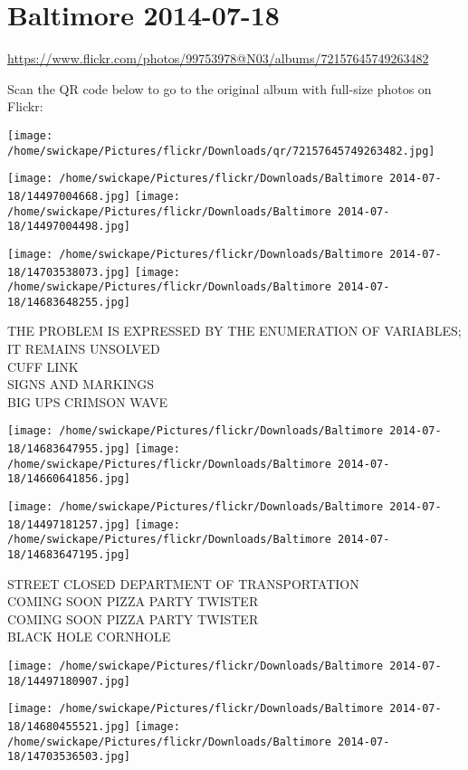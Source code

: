 \documentclass[10pt,letterpaper]{article}
\title{}
\author{}
\date{}
\begin{document}
\section*{Baltimore 2014-07-18}

\url{https://www.flickr.com/photos/99753978@N03/albums/72157645749263482}

Scan the QR code below to go to the original album with full-size photos on Flickr:

\texttt{[image: /home/swickape/Pictures/flickr/Downloads/qr/72157645749263482.jpg]}
\pagebreak

\texttt{[image: /home/swickape/Pictures/flickr/Downloads/Baltimore 2014-07-18/14497004668.jpg]}
\texttt{[image: /home/swickape/Pictures/flickr/Downloads/Baltimore 2014-07-18/14497004498.jpg]}

\texttt{[image: /home/swickape/Pictures/flickr/Downloads/Baltimore 2014-07-18/14703538073.jpg]}
\texttt{[image: /home/swickape/Pictures/flickr/Downloads/Baltimore 2014-07-18/14683648255.jpg]}

THE PROBLEM IS EXPRESSED BY THE ENUMERATION OF VARIABLES; IT REMAINS UNSOLVED\\
CUFF LINK\\
SIGNS AND MARKINGS\\
BIG UPS CRIMSON WAVE
\pagebreak

\texttt{[image: /home/swickape/Pictures/flickr/Downloads/Baltimore 2014-07-18/14683647955.jpg]}
\texttt{[image: /home/swickape/Pictures/flickr/Downloads/Baltimore 2014-07-18/14660641856.jpg]}

\texttt{[image: /home/swickape/Pictures/flickr/Downloads/Baltimore 2014-07-18/14497181257.jpg]}
\texttt{[image: /home/swickape/Pictures/flickr/Downloads/Baltimore 2014-07-18/14683647195.jpg]}

STREET CLOSED DEPARTMENT OF TRANSPORTATION\\
COMING SOON PIZZA PARTY TWISTER\\
COMING SOON PIZZA PARTY TWISTER\\
BLACK HOLE CORNHOLE
\pagebreak

\texttt{[image: /home/swickape/Pictures/flickr/Downloads/Baltimore 2014-07-18/14497180907.jpg]}

\vspace{0.25in}
\texttt{[image: /home/swickape/Pictures/flickr/Downloads/Baltimore 2014-07-18/14680455521.jpg]}
\texttt{[image: /home/swickape/Pictures/flickr/Downloads/Baltimore 2014-07-18/14703536503.jpg]}
\end{document}
